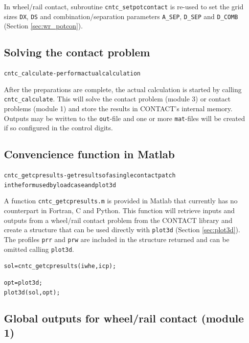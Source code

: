 \documentclass[12pt]{report}
\begin{document}
In wheel/rail contact, subroutine {\tt cntc\_setpotcontact} is re-used to
set the grid sizes {\tt DX}, {\tt DS} and combination/separation parameters
{\tt A\_SEP}, {\tt D\_SEP} and {\tt D\_COMB} (Section \ref{sec:wr_potcon}).

\subsection{Solving the contact problem}

\begin{alltt}\small
cntc_calculate                - perform actual calculation
\end{alltt}

After the preparations are complete, the actual calculation is started by
calling {\tt cntc\_\-cal\-cu\-late}. This will solve the contact problem
(module 3) or contact problems (module 1) and store the results in
CONTACT's internal memory. Outputs may be written to the {\tt out}-file and
one or more {\tt mat}-files will be created if so configured in the control
digits.

\subsection{Convencience function in Matlab}

\begin{alltt}\small
cntc_getcpresults             - get results of a single contact patch
                                in the form used by loadcase and plot3d
\end{alltt}

A function {\tt cntc\_getcpresults.m} is provided in Matlab that currently
has no counterpart in Fortran, C and Python. This function will retrieve
inputs and outputs from a wheel/rail contact problem from the CONTACT
library and create a structure that can be used directly with {\tt plot3d}
(Section \ref{sec:plot3d}). The profiles {\tt prr} and {\tt prw} are
included in the structure returned and can be omitted calling {\tt plot3d}.
\begin{alltt}\small
   sol = cntc_getcpresults(iwhe, icp);

   opt = plot3d;
   plot3d(sol, opt);
\end{alltt}

\subsection{Global outputs for wheel/rail contact (module 1)}
\label{sec:global_output1}
\end{document}
